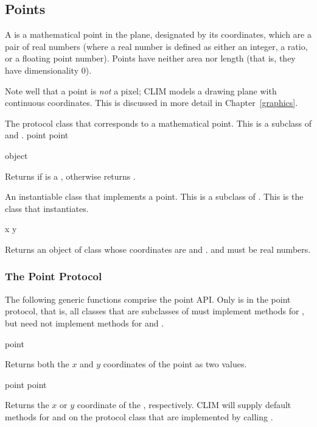\subsection {Points}

A  is a mathematical point in the plane, designated by its
coordinates, which are a pair of real numbers (where a real number is defined as
either an integer, a ratio, or a floating point number).  Points have neither
area nor length (that is, they have dimensionality 0).

Note well that a point is {\sl not} a pixel; CLIM models a drawing plane with
continuous coordinates.  This is discussed in more detail in
Chapter~\ref{graphics}.


The protocol class that corresponds to a mathematical point.  This is a subclass
of  and .
 {point} {point}

 {object}

Returns  if  is a , otherwise returns
.


An instantiable class that implements a point.  This is a subclass of .
This is the class that  instantiates.  
\Immutable

 {x y}

Returns an object of class  whose coordinates are  and
.   and  must be real numbers.


\subsubsection {The Point Protocol}

The following generic functions comprise the point API.  Only
 is in the point protocol, that is, all classes that are
subclasses of  must implement methods for , but
need not implement methods for  and .

 {point}

Returns both the $x$ and $y$ coordinates of the point  as two values.

 {point}
 {point}

Returns the $x$ or $y$ coordinate of the  , respectively.
CLIM will supply default methods for  and  on the
protocol class  that are implemented by calling .


